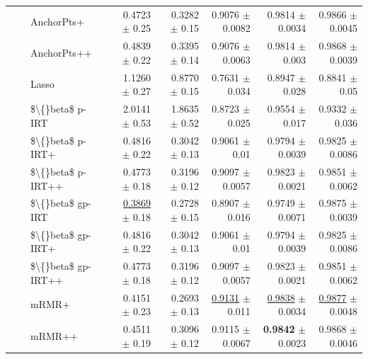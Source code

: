 \begin{longtable}{llp{}rrrrr}
 &  & AnchorPts+ & 0.4723 {\scriptsize $\pm$ 0.25} & 0.3282 {\scriptsize $\pm$ 0.15} & 0.9076 {\scriptsize $\pm$ 0.0082} & 0.9814 {\scriptsize $\pm$ 0.0034} & 0.9866 {\scriptsize $\pm$ 0.0045} \\
 &  & AnchorPts++ & 0.4839 {\scriptsize $\pm$ 0.22} & 0.3395 {\scriptsize $\pm$ 0.14} & 0.9076 {\scriptsize $\pm$ 0.0063} & 0.9814 {\scriptsize $\pm$ 0.003} & 0.9868 {\scriptsize $\pm$ 0.0039} \\
 &  & Lasso & 1.1260 {\scriptsize $\pm$ 0.27} & 0.8770 {\scriptsize $\pm$ 0.15} & 0.7631 {\scriptsize $\pm$ 0.034} & 0.8947 {\scriptsize $\pm$ 0.028} & 0.8841 {\scriptsize $\pm$ 0.05} \\
 &  & \$\textbackslash\{\}beta\$ p-IRT & 2.0141 {\scriptsize $\pm$ 0.53} & 1.8635 {\scriptsize $\pm$ 0.52} & 0.8723 {\scriptsize $\pm$ 0.025} & 0.9554 {\scriptsize $\pm$ 0.017} & 0.9332 {\scriptsize $\pm$ 0.036} \\
 &  & \$\textbackslash\{\}beta\$ p-IRT+ & 0.4816 {\scriptsize $\pm$ 0.22} & 0.3042 {\scriptsize $\pm$ 0.13} & 0.9061 {\scriptsize $\pm$ 0.01} & 0.9794 {\scriptsize $\pm$ 0.0039} & 0.9825 {\scriptsize $\pm$ 0.0086} \\
 &  & \$\textbackslash\{\}beta\$ p-IRT++ & 0.4773 {\scriptsize $\pm$ 0.18} & 0.3196 {\scriptsize $\pm$ 0.12} & 0.9097 {\scriptsize $\pm$ 0.0057} & 0.9823 {\scriptsize $\pm$ 0.0021} & 0.9851 {\scriptsize $\pm$ 0.0062} \\
 &  & \$\textbackslash\{\}beta\$ gp-IRT & \underline{0.3869} {\scriptsize $\pm$ 0.18} & 0.2728 {\scriptsize $\pm$ 0.15} & 0.8907 {\scriptsize $\pm$ 0.016} & 0.9749 {\scriptsize $\pm$ 0.0071} & 0.9875 {\scriptsize $\pm$ 0.0039} \\
 &  & \$\textbackslash\{\}beta\$ gp-IRT+ & 0.4816 {\scriptsize $\pm$ 0.22} & 0.3042 {\scriptsize $\pm$ 0.13} & 0.9061 {\scriptsize $\pm$ 0.01} & 0.9794 {\scriptsize $\pm$ 0.0039} & 0.9825 {\scriptsize $\pm$ 0.0086} \\
 &  & \$\textbackslash\{\}beta\$ gp-IRT++ & 0.4773 {\scriptsize $\pm$ 0.18} & 0.3196 {\scriptsize $\pm$ 0.12} & 0.9097 {\scriptsize $\pm$ 0.0057} & 0.9823 {\scriptsize $\pm$ 0.0021} & 0.9851 {\scriptsize $\pm$ 0.0062} \\
 &  & mRMR+ & 0.4151 {\scriptsize $\pm$ 0.23} & 0.2693 {\scriptsize $\pm$ 0.13} & \underline{0.9131} {\scriptsize $\pm$ 0.011} & \underline{0.9838} {\scriptsize $\pm$ 0.0034} & \underline{0.9877} {\scriptsize $\pm$ 0.0048} \\
 &  & mRMR++ & 0.4511 {\scriptsize $\pm$ 0.19} & 0.3096 {\scriptsize $\pm$ 0.12} & 0.9115 {\scriptsize $\pm$ 0.0067} & \textbf{0.9842} {\scriptsize $\pm$ 0.0023} & 0.9868 {\scriptsize $\pm$ 0.0046} \\

\end{longtable}

